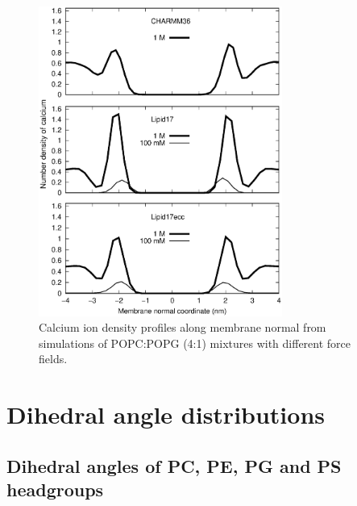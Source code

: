 \documentclass[journal=jpcbfk]{achemso}
\begin{document}
\begin{figure}[]
  \centering
  \includegraphics[width=8.0cm]{./Figs/CAdensPG1PC4.eps}
  \caption{\label{CAdensPG1PC4}
    Calcium ion density profiles along membrane normal from simulations of POPC:POPG (4:1) mixtures with different force fields.
  }
\end{figure}

\clearpage
\section{Dihedral angle distributions}
  

\subsection{Dihedral angles of PC, PE, PG and PS headgroups}

\end{document}
